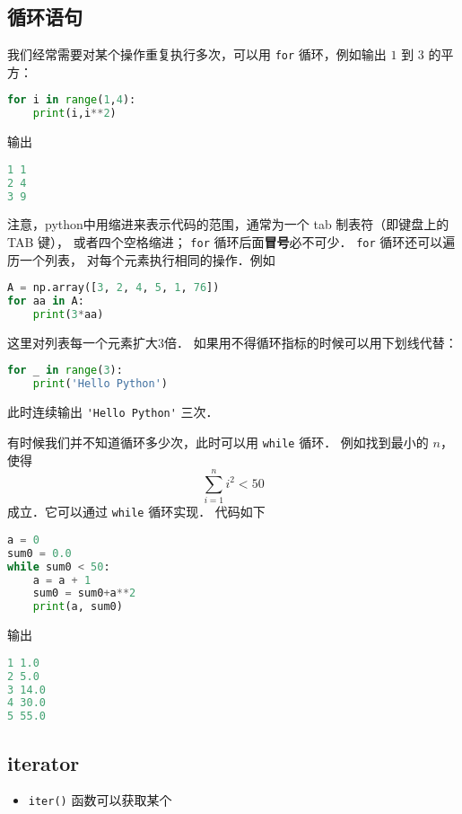 \subsection{循环语句}
我们经常需要对某个操作重复执行多次，可以用 \verb|for| 循环，例如输出 $1$ 到 $3$ 的平方：
\begin{lstlisting}[language=python]
for i in range(1,4):
    print(i,i**2)
\end{lstlisting}
输出
\begin{lstlisting}[language=python]
1 1
2 4
3 9
\end{lstlisting}
注意，python中用缩进来表示代码的范围，通常为一个 tab 制表符（即键盘上的 TAB 键）， 或者四个空格缩进； \verb|for| 循环后面\textbf{冒号}必不可少． \verb|for| 循环还可以遍历一个列表， 对每个元素执行相同的操作．例如
\begin{lstlisting}[language=python]
A = np.array([3, 2, 4, 5, 1, 76])
for aa in A:
    print(3*aa)
\end{lstlisting}
这里对列表每一个元素扩大3倍． 如果用不得循环指标的时候可以用下划线代替：
\begin{lstlisting}[language=python]
for _ in range(3):
    print('Hello Python')
\end{lstlisting}
此时连续输出   \verb|'Hello Python'|  三次．

有时候我们并不知道循环多少次，此时可以用 \verb|while| 循环． 例如找到最小的 $n$，使得
\begin{equation}
\sum_{i=1}^n i^2<50
\end{equation}
成立．它可以通过 \verb|while| 循环实现． 代码如下
\begin{lstlisting}[language=python]
a = 0
sum0 = 0.0
while sum0 < 50:
    a = a + 1
    sum0 = sum0+a**2
    print(a, sum0)
\end{lstlisting}
输出
\begin{lstlisting}[language=python]
1 1.0
2 5.0
3 14.0
4 30.0
5 55.0
\end{lstlisting}

\subsection{iterator}
\begin{itemize}
\item \verb|iter()| 函数可以获取某个
\end{itemize}


